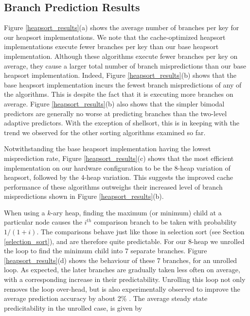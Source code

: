 \documentclass[acmtocl]{acmtrans2m}
\begin{document}
\subsection{Branch Prediction Results}
\label{heapsort_branch_results_text}

Figure \ref{heapsort_results}(a) shows the average number of branches per key
for our heapsort implementations. We note that the cache-optimized heapsort
implementations execute fewer branches per key than our base heapsort
implementation. Although these algorithms execute fewer branches per key on
average, they cause a larger total number of branch mispredictions than our base
heapsort implementation. Indeed, Figure \ref{heapsort_results}(b) shows that the
base heapsort implementation incurs the fewest branch mispredictions of any of
the algorithms.  This is despite the fact that it is executing more branches on
average.  Figure \ref{heapsort_results}(b) also shows that the simpler bimodal
predictors are generally no worse at predicting branches than the two-level
adaptive predictors. With the exception of shellsort, this is in keeping with
the trend we observed for the other sorting algorithms examined so far.

Notwithstanding the base heapsort implementation having the lowest misprediction
rate, Figure \ref{heapsort_results}(c) shows that the most efficient
implementation on our hardware configuration to be the 8-heap variation of
heapsort, followed by the 4-heap variation.  This suggests the improved cache
performance of these algorithms outweighs their increased level of branch
mispredictions shown in Figure \ref{heapsort_results}(b).

When using a $k$-ary heap, finding the maximum (or minimum) child at a
particular node causes the $i^{th}$ comparison branch to be taken with
probability $1/(1 + i)$. The comparisons behave just like those in selection
sort (see Section \ref{selection_sort}), and are therefore quite predictable.
For our 8-heap we unrolled the loop to find the minimum child into 7 separate
branches.  Figure \ref{heapsort_results}(d) shows the behaviour of these 7
branches, for an unrolled loop.  As expected, the later branches are gradually
taken less often on average, with a corresponding increase in their
predictability.  Unrolling this loop not only removes the loop over-head, but is
also experimentally observed to improve the average prediction accuracy by about
2\% \cite{BiggarGregg05}.  The average steady state predicitability in the
unrolled case, is given by
\end{document}
